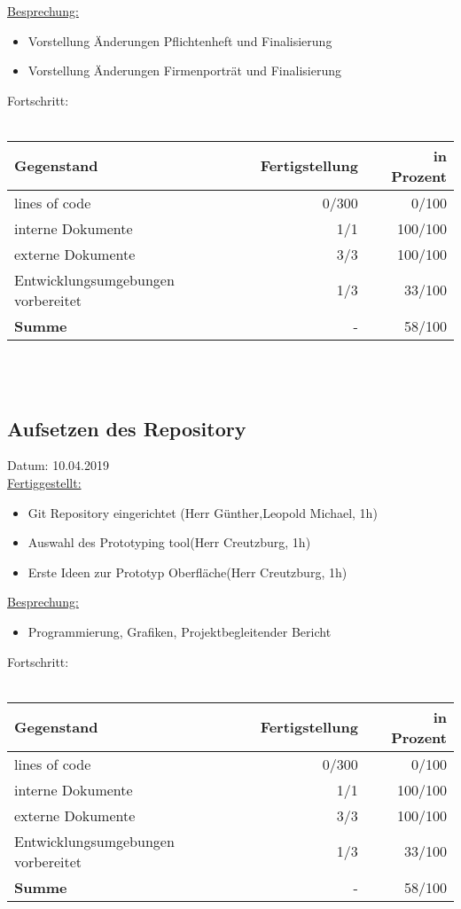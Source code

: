 \documentclass[12pt]{article}
\begin{document}
\uline{Besprechung:}
\begin{itemize}\itemsep0em
\item Vorstellung Änderungen Pflichtenheft und Finalisierung
\item Vorstellung Änderungen Firmenporträt und Finalisierung
\end{itemize}

Fortschritt:\\\\
\begin{tabularx}{\textwidth}{|X|r|r|} \hline
\textbf{Gegenstand}&\textbf{Fertigstellung} & \textbf{in Prozent}\\ \hline
lines of code & 0/300  & 0/100\\ \hline
interne Dokumente & 1/1 & 100/100  \\ \hline
externe Dokumente & 3/3 & 100/100 \\ \hline
Entwicklungsumgebungen vorbereitet & 1/3 & 33/100 \\ \hline
\textbf{Summe} & - & 58/100  \\ \hline
\end{tabularx}\\\\

\newpage
\subsection{Aufsetzen des Repository}
Datum: 10.04.2019 \\

\uline{Fertiggestellt:}
\begin{itemize}\itemsep0em
\item Git Repository eingerichtet (Herr Günther,Leopold Michael, 1h)
\item Auswahl des Prototyping tool(Herr Creutzburg, 1h)
\item Erste Ideen zur Prototyp Oberfläche(Herr Creutzburg, 1h)
\end{itemize}

\uline{Besprechung:}
\begin{itemize}\itemsep0em
\item Programmierung, Grafiken, Projektbegleitender Bericht
\end{itemize}

Fortschritt:\\\\
\begin{tabularx}{\textwidth}{|X|r|r|} \hline
\textbf{Gegenstand}&\textbf{Fertigstellung} & \textbf{in Prozent}\\ \hline
lines of code & 0/300  & 0/100\\ \hline
interne Dokumente & 1/1 & 100/100  \\ \hline
externe Dokumente & 3/3 & 100/100 \\ \hline
Entwicklungsumgebungen vorbereitet & 1/3 & 33/100 \\ \hline
\textbf{Summe} & - & 58/100  \\ \hline
\end{tabularx}\\\\
\end{document}
